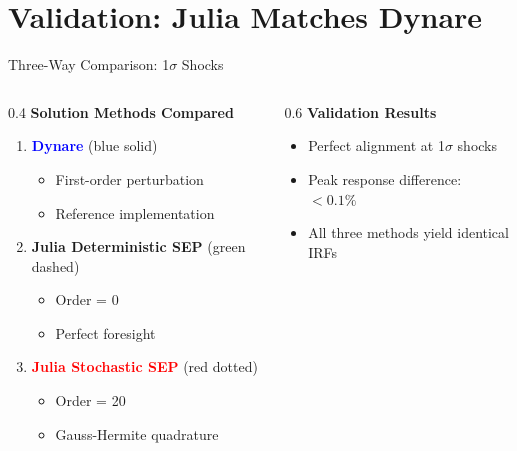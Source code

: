 \documentclass[aspectratio=169,12pt]{beamer}
\begin{document}
\section{Validation: Julia Matches Dynare}

\begin{frame}{Three-Way Comparison: 1$\sigma$ Shocks}

\begin{columns}[T]
\begin{column}{0.4\textwidth}
\textbf{Solution Methods Compared}
\begin{enumerate}
\item \textcolor{blue}{\textbf{Dynare}} (blue solid)
\begin{itemize}
\item First-order perturbation
\item Reference implementation
\end{itemize}

\vspace{0.2cm}
\item \textcolor{green!60!black}{\textbf{Julia Deterministic SEP}} (green dashed)
\begin{itemize}
\item Order = 0
\item Perfect foresight
\end{itemize}

\vspace{0.2cm}
\item \textcolor{red}{\textbf{Julia Stochastic SEP}} (red dotted)
\begin{itemize}
\item Order = 20
\item Gauss-Hermite quadrature
\end{itemize}
\end{enumerate}
\end{column}

\begin{column}{0.6\textwidth}
\textbf{Validation Results}
\begin{itemize}
\item Perfect alignment at 1$\sigma$ shocks
\item Peak response difference: $<0.1\%$
\item All three methods yield identical IRFs
\end{itemize}


\end{column}
\end{columns}
\end{frame}
\end{document}
